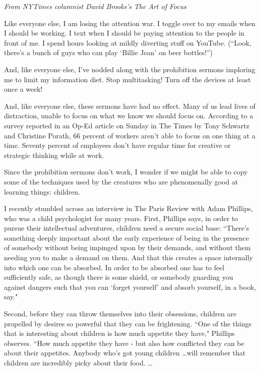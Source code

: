 \documentclass[12pt]{book}
\renewcommand{\indent}{\hspace{1cm}}
\begin{document}
\newpage
\textit{From NYTimes columnist David Brooks's The Art of Focus}

\bigskip
\begin{linenumbers*}
\modulolinenumbers[5]
\indent Like everyone else, I am losing the attention war. I toggle over to my emails when I should be working. I text when I should be paying attention to the people in front of me. I spend hours looking at mildly diverting stuff on YouTube. (“Look, there's a bunch of guys who can play ‘Billie Jean' on beer bottles!”) 

\indent And, like everyone else, I've nodded along with the prohibition sermons imploring me to limit my information diet. Stop multitasking! Turn off the devices at least once a week!

\indent And, like everyone else, these sermons have had no effect. Many of us lead lives of distraction, unable to focus on what we know we should focus on. According to a survey reported in an Op-Ed article on Sunday in The Times by Tony Schwartz and Christine Porath, 66 percent of workers aren't able to focus on one thing at a time. Seventy percent of employees don't have regular time for creative or strategic thinking while at work.

\indent Since the prohibition sermons don't work, I wonder if we might be able to copy some of the techniques used by the creatures who are phenomenally good at learning things: children.

\indent I recently stumbled across an interview in The Paris Review with Adam Phillips, who was a child psychologist for many years. First, Phillips says, in order to pursue their intellectual adventures, children need a secure social base:
``There's something deeply important about the early experience of being in the presence of somebody without being impinged upon by their demands, and without them needing you to make a demand on them. And that this creates a space internally into which one can be absorbed. In order to be absorbed one has to feel sufficiently safe, as though there is some shield, or somebody guarding you against dangers such that you can ‘forget yourself' and absorb yourself, in a book, say."

\indent Second, before they can throw themselves into their obsessions, children are propelled by desires so powerful that they can be frightening. ``One of the things that is interesting about children is how much appetite they have," Phillips observes. “How much appetite they have - but also how conflicted they can be about their appetites. Anybody who's got young children \ldots will remember that children are incredibly picky about their food. \ldots


\end{linenumbers*}
\end{document}
